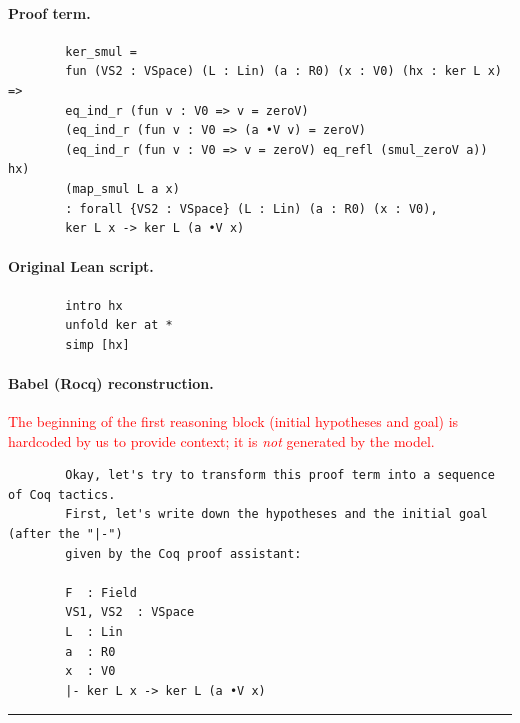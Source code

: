 \documentclass{article}
\theoremstyle{plain}
\theoremstyle{definition}
\theoremstyle{remark}
\begin{document}
	\paragraph{Proof term.}
	\begin{verbatim}
		ker_smul =
		fun (VS2 : VSpace) (L : Lin) (a : R0) (x : V0) (hx : ker L x) =>
		eq_ind_r (fun v : V0 => v = zeroV)
		(eq_ind_r (fun v : V0 => (a •V v) = zeroV)
		(eq_ind_r (fun v : V0 => v = zeroV) eq_refl (smul_zeroV a)) hx)
		(map_smul L a x)
		: forall {VS2 : VSpace} (L : Lin) (a : R0) (x : V0),
		ker L x -> ker L (a •V x)
	\end{verbatim}
	
	\paragraph{Original Lean script.}
	\begin{verbatim}
		intro hx
		unfold ker at *
		simp [hx]
	\end{verbatim}
	
	
	\paragraph{Babel (Rocq) reconstruction.}
	
	\noindent\textcolor{red}{The beginning of the first reasoning block (initial hypotheses and goal) is hardcoded by us to provide context; it is \emph{not} generated by the model.}
	
	\begin{verbatim}
		Okay, let's try to transform this proof term into a sequence of Coq tactics.
		First, let's write down the hypotheses and the initial goal (after the "|-") 
		given by the Coq proof assistant:
		
		F  : Field
		VS1, VS2  : VSpace
		L  : Lin
		a  : R0
		x  : V0
		|- ker L x -> ker L (a •V x)
	\end{verbatim}
	
	\noindent\rule{6cm}{0.4pt}
	
\end{document}
